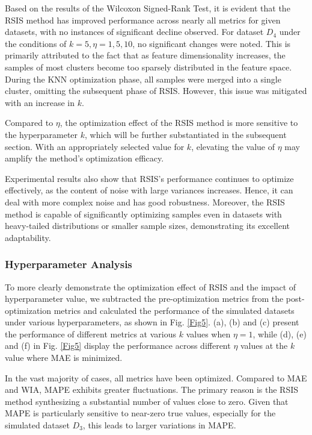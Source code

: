 \documentclass[lettersize,journal]{IEEEtran}
\begin{document}
Based on the results of the Wilcoxon Signed-Rank Test, it is 
evident that the RSIS method has improved performance across 
nearly all metrics for given datasets, with no instances of 
significant decline observed. For dataset $D_4$ under the 
conditions of $k=5,\eta=1,5,10$, no significant changes were 
noted. This is primarily attributed to the fact that as feature 
dimensionality increases, the samples of most clusters become too 
sparsely distributed in the feature space. During the KNN 
optimization phase, all samples were merged into a single cluster, 
omitting the subsequent phase of RSIS. However, this issue was 
mitigated with an increase in $k$. 

Compared to $\eta$, the optimization effect of the RSIS method 
is more sensitive to the hyperparameter $k$, which will be 
further substantiated in the subsequent section. With an 
appropriately selected value for $k$, elevating the value of 
$\eta$ may amplify the method's optimization efficacy.

Experimental results also show that RSIS's performance continues 
to optimize effectively, as the content of noise with large 
variances increases. Hence, it can deal with more complex noise 
and has good robustness. Moreover, the RSIS method is capable of 
significantly optimizing samples even in datasets with 
heavy-tailed distributions or smaller sample sizes, demonstrating 
its excellent adaptability. 

\subsubsection{Hyperparameter Analysis}
To more clearly demonstrate the optimization effect of RSIS and 
the impact of hyperparameter value, we subtracted the 
pre-optimization metrics from the post-optimization metrics 
and calculated the performance of the simulated datasets under 
various hyperparameters, as shown in Fig. \ref{Fig5}. (a), (b) and (c) 
present the performance of different metrics at various $k$ values 
when $\eta=1$, while (d), (e) and (f) in Fig. \ref{Fig5} display the 
performance across different $\eta$ values at the $k$ value 
where MAE is minimized. 

In the vast majority of cases, all metrics have been optimized. 
Compared to MAE and WIA, MAPE exhibits greater fluctuations. 
The primary reason is the RSIS method synthesizing a substantial 
number of values close to zero. Given that MAPE is particularly 
sensitive to near-zero true values, especially for the simulated 
dataset $D_3$, this leads to larger variations in MAPE.
\end{document}
